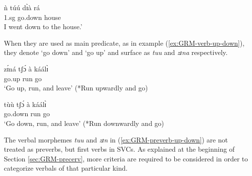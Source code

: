 \begin{exe}
\begin{exe}
\begin{exe}
{\begin{exe}
\begin{exe}
\begin{exe}
\begin{exe}
\begin{exe}
\begin{exe}
\begin{exe}
\begin{xlist}
\begin{exe}
\begin{exe}
\begin{exe}
\begin{exe}
\begin{exe}
\begin{exe}
\begin{exe}
\begin{exe}
\begin{exe}
\begin{exe}
\begin{exe}
\begin{exe}
\begin{exe}
\begin{exe}
\begin{exe}
\ex
\gll ǹ túú dɪ̀à rá\\
{\sc 1.sg} go.down house {\foc}\\
\glt I went down to the house.'
\z 
 \z

When they are used as main
predicate, as in example (\ref{ex:GRM-verb-up-down}),  they denote `go down' and
`go up' and  surface as {\it tuu} and {\it zɪna} respectively. 




\ea\label{ex:GRM-preverb-up-down}
\ea\label{ex:GRM-preverb-up}
\gll zɪ́ná tʃɔ́  à káálɪ̀  \\
      {go.up} run {\conn} go  \\
\glt  `Go up,  run, and leave'  (*Run upwardly and go)

\ex\label{ex:GRM-preverb-down}
\gll tùù tʃɔ́  à káálɪ̀\\
      {go.down} run {\conn} go \\
\glt  `Go down, run, and leave'  (*Run downwardly and go)

\z 
 \z
 
The verbal morphemes {\it tuu} and {\it zɪn} in (\ref{ex:GRM-preverb-up-down}) 
are not treated as preverbs, but first verbs in SVCs.  As explained at the 
beginning of  Section \ref{sec:GRM-precerv}, more criteria are required to be 
considered in order to categorize verbals  of that particular kind.






\end{exe}
\end{exe}
\end{exe}
\end{exe}
\end{exe}
\end{exe}
\end{exe}
\end{exe}
\end{exe}
\end{exe}
\end{exe}
\end{exe}
\end{exe}
\end{exe}
\end{exe}
\end{xlist}
\end{exe}
\end{exe}
\end{exe}
\end{exe}
\end{exe}
\end{exe}
\end{exe}}
\end{exe}
\end{exe}
\end{exe}
